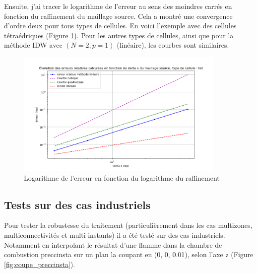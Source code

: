 Ensuite, j'ai tracer le logarithme de l'erreur au sens des moindres carrés en fonction du raffinement du maillage source. %
Cela a montré une convergence d'ordre deux pour tous types de cellules. En voici l'exemple avec des cellules tétraédriques (Figure \ref{fig:err_tet}). Pour les autres types de cellules, ainsi que pour la méthode IDW avec \((N=2, p=1)\) (linéaire), les courbes sont similaires. 
\begin{figure}[H]
    \centering
    \includegraphics[width=0.90\textwidth]{images/err_puissance2_tet.png}
    \caption{Logarithme de l'erreur en fonction du logarithme du raffinement}
    \label{fig:err_tet}
\end{figure}

\newpage

\subsection{Tests sur des cas industriels}

Pour tester la robustesse du traitement (particulièrement dans les cas multizones, multiconnectivités et multi-instants) il a été testé sur des cas industriels. Notamment en interpolant le résultat d'une flamme dans la chambre de combustion preccinsta sur un plan la coupant en (0, 0, 0.01), selon l'axe z (Figure \ref{fig:coupe_preccinsta}).

